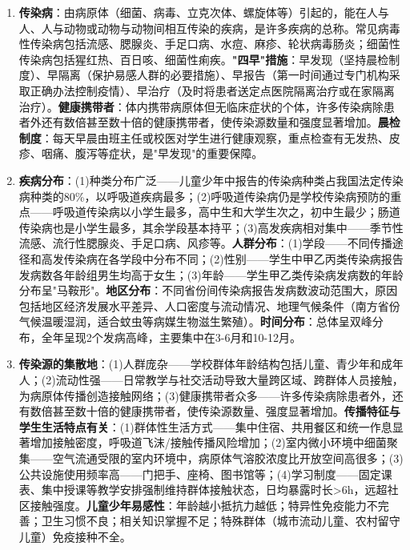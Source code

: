 \begin{enumerate}[leftmargin=*, itemsep=5pt]
    \item \textbf{传染病}：由病原体（细菌、病毒、立克次体、螺旋体等）引起的，能在人与人、人与动物或动物与动物间相互传染的疾病，是许多疾病的总称。常见病毒性传染病包括流感、腮腺炎、手足口病、水痘、麻疹、轮状病毒肠炎；细菌性传染病包括猩红热、百日咳、细菌性痢疾。\textbf{"四早"措施}：早发现（坚持晨检制度）、早隔离（保护易感人群的必要措施）、早报告（第一时间通过专门机构采取正确办法控制疫情）、早治疗（及时将患者送定点医院隔离治疗或在家隔离治疗）。\textbf{健康携带者}：体内携带病原体但无临床症状的个体，许多传染病除患者外还有数倍甚至数十倍的健康携带者，使传染源数量和强度显著增加。\textbf{晨检制度}：每天早晨由班主任或校医对学生进行健康观察，重点检查有无发热、皮疹、咽痛、腹泻等症状，是"早发现"的重要保障。

    \item \textbf{疾病分布}：(1)种类分布广泛——儿童少年中报告的传染病种类占我国法定传染病种类的80\%，以呼吸道疾病最多；(2)呼吸道传染病仍是学校传染病预防的重点——呼吸道传染病以小学生最多，高中生和大学生次之，初中生最少；肠道传染病也是小学生最多，其余学段基本持平；(3)高发疾病相对集中——季节性流感、流行性腮腺炎、手足口病、风疹等。\textbf{人群分布}：(1)学段——不同传播途径和高发传染病在各学段中分布不同；(2)性别——学生中甲乙丙类传染病报告发病数各年龄组男生均高于女生；(3)年龄——学生甲乙类传染病发病数的年龄分布呈"马鞍形"。\textbf{地区分布}：不同省份间传染病报告发病数波动范围大，原因包括地区经济发展水平差异、人口密度与流动情况、地理气候条件（南方省份气候温暖湿润，适合蚊虫等病媒生物滋生繁殖）。\textbf{时间分布}：总体呈双峰分布，全年呈现2个发病高峰，主要集中在3-6月和10-12月。

    \item \textbf{传染源的集散地}：(1)人群庞杂——学校群体年龄结构包括儿童、青少年和成年人；(2)流动性强——日常教学与社交活动导致大量跨区域、跨群体人员接触，为病原体传播创造接触网络；(3)健康携带者众多——许多传染病除患者外，还有数倍甚至数十倍的健康携带者，使传染源数量、强度显著增加。\textbf{传播特征与学生生活特点有关}：(1)群体性生活方式——集中住宿、共用餐区和统一作息显著增加接触密度，呼吸道飞沫/接触传播风险增加；(2)室内微小环境中细菌聚集——空气流通受限的室内环境中，病原体气溶胶浓度比开放空间高很多；(3)公共设施使用频率高——门把手、座椅、图书馆等；(4)学习制度——固定课表、集中授课等教学安排强制维持群体接触状态，日均暴露时长>6h，远超社区接触强度。\textbf{儿童少年易感性}：年龄越小抵抗力越低；特异性免疫能力不完善；卫生习惯不良；相关知识掌握不足；特殊群体（城市流动儿童、农村留守儿童）免疫接种不全。


\end{enumerate}
